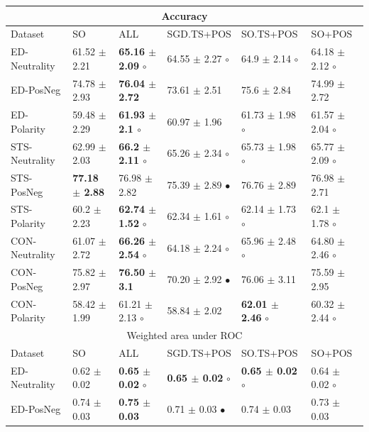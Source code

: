 \documentclass{sig-alternate}
\begin{document}
\begin{table}[htbp]
\begin{center}
\begin{tabular}{l|l|l|l|l|l}
\hline \hline
\multicolumn{ 6}{c}{Accuracy } \\ \hline \hline
Dataset & SO & ALL & SGD.TS+POS & SO.TS+POS & SO+POS \\ \hline
ED-Neutrality & 61.52 $\pm$ 2.21 & \textbf{65.16 $\pm$ 2.09} $\circ$ & 64.55 $\pm$ 2.27 $\circ$ & 64.9 $\pm$ 2.14  $\circ$ & 64.18 $\pm$ 2.12 $\circ$ \\ 
ED-PosNeg & 74.78 $\pm$ 2.93 & \textbf{76.04 $\pm$ 2.72} & 73.61 $\pm$ 2.51 & 75.6 $\pm$ 2.84 & 74.99 $\pm$ 2.72 \\ 
ED-Polarity & 59.48 $\pm$ 2.29 & \textbf{61.93 $\pm$ 2.1 $\circ$} & 60.97 $\pm$ 1.96 & 61.73 $\pm$ 1.98 $\circ$ & 61.57 $\pm$ 2.04 $\circ$ \\  \hline
STS-Neutrality & 62.99 $\pm$ 2.03 & \textbf{66.2 $\pm$ 2.11 $\circ$} & 65.26 $\pm$ 2.34 $\circ$ & 65.73 $\pm$ 1.98 $\circ$ & 65.77 $\pm$ 2.09 $\circ$ \\ 
STS-PosNeg & \textbf{77.18 $\pm$ 2.88} & 76.98 $\pm$ 2.82 & 75.39 $\pm$ 2.89 $\bullet$ & 76.76 $\pm$ 2.89 & 76.98 $\pm$ 2.71 \\ 
STS-Polarity & 60.2 $\pm$ 2.23 & \textbf{62.74 $\pm$ 1.52} $\circ$ & 62.34 $\pm$ 1.61 $\circ$ & 62.14 $\pm$ 1.73 $\circ$ & 62.1 $\pm$ 1.78 $\circ$ \\  \hline
CON-Neutrality & 61.07 $\pm$ 2.72 & \textbf{66.26 $\pm$ 2.54} $\circ$ & 64.18 $\pm$ 2.24  $\circ$ & 65.96 $\pm$ 2.48 $\circ$ & 64.80 $\pm$ 2.46 $\circ$ \\ 
CON-PosNeg & 75.82 $\pm$ 2.97 & \textbf{76.50 $\pm$ 3.1} & 70.20 $\pm$ 2.92 $\bullet$  & 76.06 $\pm$ 3.11  & 75.59 $\pm$ 2.95 \\ 
CON-Polarity & 58.42 $\pm$ 1.99 & 61.21 $\pm$ 2.13 $\circ$ & 58.84 $\pm$ 2.02 & \textbf{62.01 $\pm$ 2.46} $\circ$ & 60.32 $\pm$ 2.44 $\circ$ \\ \hline \hline
\multicolumn{ 6}{c}{Weighted area under ROC } \\ \hline \hline
Dataset & SO & ALL & SGD.TS+POS & SO.TS+POS & SO+POS \\ \hline
ED-Neutrality & 0.62 $\pm$ 0.02 &  \textbf{0.65 $\pm$ 0.02} $\circ$ & \textbf{0.65 $\pm$ 0.02} $\circ$  & \textbf{0.65 $\pm$ 0.02} $\circ$ & 0.64 $\pm$ 0.02 $\circ$ \\ 
ED-PosNeg & 0.74 $\pm$ 0.03 & \textbf{0.75 $\pm$ 0.03} & 0.71 $\pm$ 0.03 $\bullet$ & 0.74 $\pm$ 0.03 & 0.73 $\pm$ 0.03 \\ 

\end{tabular}
\end{center}
\end{table}
\end{document}
